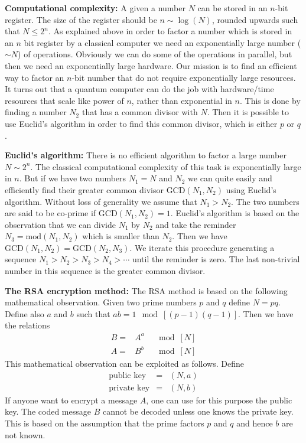 \documentclass[onecolumn,fleqn]{revtex4}
\newcommand{\beq}{\begin{eqnarray}}
\newcommand{\eeq}{\end{eqnarray}}
\begin{document}
{\bf Computational complexity:}
A given a number $N$ can be stored in an $n$-bit 
register. The size of the register should be 
$n \sim \log(N)$, rounded upwards such that $N \le 2^n$. 
As explained above in order to factor a number 
which is stored in an $n$ bit register by a classical computer 
we need an exponentially large number ($\sim N$) 
of operations. Obviously we can do some of the operations 
in parallel, but then we need an exponentially 
large hardware. Our mission is to find an efficient 
way to factor an $n$-bit number that do not 
require exponentially large resources. It turns
out that a quantum computer can do the job 
with hardware/time resources that scale like 
power of $n$, rather than exponential in $n$.      
This is done by finding a number $N_2$ that has a common 
divisor with $N$. Then it is possible to use 
Euclid's algorithm in order to find this common 
divisor, which is either $p$ or $q$.


{\bf Euclid's algorithm:}
There is no efficient algorithm to factor a large 
number ${N \sim 2^n}$. The classical computational 
complexity of this task is exponentially large in $n$. 
But if we have two numbers $N_1=N$ and $N_2$ we can quite 
easily and efficiently find their greater common divisor ${\mbox{GCD}(N_1,N_2)}$ 
using Euclid's algorithm.  
Without loss of generality we assume that ${N_1>N_2}$.  
The two numbers are said to be co-prime if ${\mbox{GCD}(N_1,N_2)=1}$.      
Euclid's algorithm is based on the observation that 
we can divide $N_1$ by $N_2$ and take 
the reminder ${N_3=\mbox{mod}(N_1,N_2)}$ 
which is smaller than $N_2$. 
Then we have ${\mbox{GCD}(N_1,N_2)=\mbox{GCD}(N_2,N_3)}$. 
We iterate this procedure generating a sequence 
${N_1>N_2>N_3>N_4>\cdots}$ until the reminder is zero.  
The last non-trivial number in this sequence 
is the greater common divisor. 


{\bf The RSA encryption method:}
The RSA method is based on the following mathematical observation. 
Given two prime numbers $p$ and $q$ define $N=pq$. 
Define also $a$ and $b$ such that ${ab=1 \mod[(p-1)(q-1)]}$. 
Then we have the relations
\beq
B =&  A^a & \ \mod[N] \\
A =&  B^b & \ \mod[N] 
\eeq  
This mathematical observation can be exploited as follows. 
Define
\beq
\mbox{public key} &=& (N,a) \\
\mbox{private key} &=& (N,b) 
\eeq  
If anyone want to encrypt a message $A$, 
one can use for this purpose the public key. 
The coded message $B$ cannot be decoded 
unless one knows the private key. 
This is based on the assumption that 
the prime factors $p$ and $q$ and hence $b$ 
are not known.    
\end{document}
